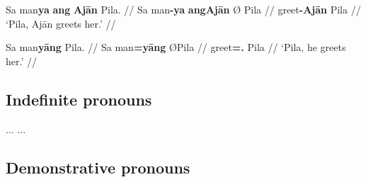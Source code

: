 \pex
\a\begingl
	\gla Sa man\textbf{ya} \textbf{ang} \textbf{Ajān} {} Pila. //
	\glb Sa man\textbf{-ya} \textbf{ang} \textbf{​Ajān} Ø ​Pila //
	\glc \PatT{} greet\textbf{-\TsgM{}} \textbf{\Aarg{}} \textbf{​Ajān} 
		\Top{} ​Pila //
	\glft `Pila, Ajān greets her.' //
\endgl

\a\begingl
	\gla Sa man\textbf{yāng} {} Pila. //
	\glb Sa man\textbf{=yāng} Ø ​Pila //
	\glc \PatT{} greet\textbf{=\TsgM{}.\Aarg{}} \Top{} ​Pila //
	\glft `Pila, he greets her.' //
\endgl
\xe


% 
% 
% 

\subsection{Indefinite pronouns}

... \citet{haspelmath2004} ...


\subsection{Demonstrative pronouns}
\label{subsec:dempro}


